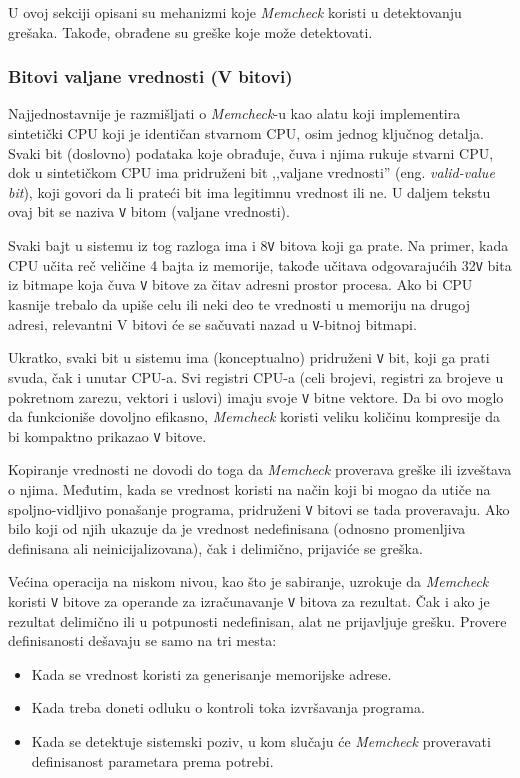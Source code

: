 \documentclass[12pt,oneside]{memoir}
\theoremstyle{plain}
\theoremstyle{definition}
\begin{document}
U ovoj sekciji opisani su mehanizmi koje \textit{Memcheck} koristi u detektovanju grešaka. Takođe, obrađene su greške koje može detektovati.

\subsubsection{Bitovi valjane vrednosti (V bitovi)}
Najjednostavnije je razmišljati o \textit{Memcheck}-u kao alatu koji implementira sintetički CPU koji je identičan stvarnom CPU, osim jednog ključnog detalja. Svaki bit (doslovno) podataka koje obrađuje, čuva i njima rukuje stvarni CPU, dok u sintetičkom CPU ima pridruženi bit ,,valjane vrednosti'' (eng. \textit{valid-value bit}), koji govori da li prateći bit ima legitimnu vrednost ili ne. U daljem tekstu ovaj bit se naziva \texttt{V} bitom (valjane vrednosti).

Svaki bajt u sistemu iz tog razloga ima i 8\texttt{V} bitova koji ga prate. Na primer, kada CPU učita reč veličine 4 bajta iz memorije, takođe učitava odgovarajućih 32\texttt{V} bita iz bitmape koja čuva \texttt{V} bitove za čitav adresni prostor procesa. Ako bi CPU kasnije trebalo da upiše celu ili neki deo te vrednosti u memoriju na drugoj adresi, relevantni V bitovi će se sačuvati nazad u \texttt{V}-bitnoj bitmapi.

Ukratko, svaki bit u sistemu ima (konceptualno) pridruženi \texttt{V} bit, koji ga prati svuda, čak i unutar CPU-a. Svi registri CPU-a (celi brojevi, registri za brojeve u pokretnom zarezu, vektori i uslovi) imaju svoje \texttt{V} bitne vektore. Da bi ovo moglo da funkcioniše dovoljno efikasno, \textit{Memcheck} koristi veliku količinu kompresije da bi kompaktno prikazao \texttt{V} bitove.

Kopiranje vrednosti ne dovodi do toga da \textit{Memcheck} proverava greške ili izveštava o njima. Međutim, kada se vrednost koristi na način koji bi mogao da utiče na spoljno-vidljivo ponašanje programa, pridruženi \texttt{V} bitovi se tada proveravaju. Ako bilo koji od njih ukazuje da je vrednost nedefinisana (odnosno promenljiva definisana ali neinicijalizovana), čak i delimično, prijaviće se greška.

Većina operacija na niskom nivou, kao što je sabiranje, uzrokuje da \textit{Memcheck} koristi \texttt{V} bitove za operande za izračunavanje \texttt{V} bitova za rezultat. Čak i ako je rezultat delimično ili u potpunosti nedefinisan, alat ne prijavljuje grešku. Provere definisanosti dešavaju se samo na tri mesta:
\begin{itemize}
\item  Kada se vrednost koristi za generisanje memorijske adrese.
\item  Kada treba doneti odluku o kontroli toka izvršavanja programa. 
\item  Kada se detektuje sistemski poziv, u kom slučaju će \textit{Memcheck} proveravati definisanost parametara prema potrebi.
\end{itemize}
\end{document}
